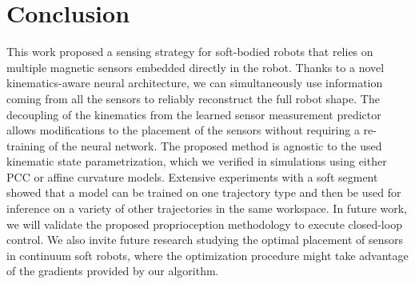 \section{Conclusion}\label{sec:promasens:conclusion}

This work proposed a sensing strategy for soft-bodied robots that relies on multiple magnetic sensors embedded directly in the robot. Thanks to a novel kinematics-aware neural architecture, we can simultaneously use information coming from all the sensors to reliably reconstruct the full robot shape. 
The decoupling of the kinematics from the learned sensor measurement predictor allows modifications to the placement of the sensors without requiring a re-training of the neural network.
The proposed method is agnostic to the used kinematic state parametrization, which we verified in simulations using either \gls{PCC} or affine curvature models.
Extensive experiments with a soft segment showed that a model can be trained on one trajectory type and then be used for inference on a variety of other trajectories in the same workspace.
In future work, we will validate the proposed proprioception methodology to execute closed-loop control. %
We also invite future research studying the optimal placement of sensors in continuum soft robots, where the optimization procedure might take advantage of the gradients provided by our algorithm.
